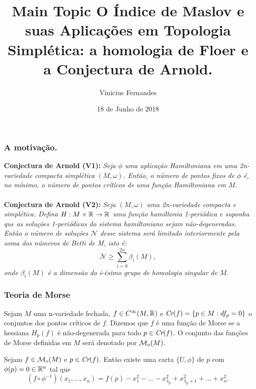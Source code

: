 \documentclass{beamer}
\title[Short title]{Main Topic } %
\author{Vinicius Fernandes}
\title{O Índice de Maslov e suas Aplicações em Topologia Simplética: a homologia de Floer e a Conjectura de Arnold.}
\institute{Universidade Federal do ABC}
\date{18 de Junho de 2018}
\begin{document}
	
	\begin{frame}
		\titlepage %
	\end{frame}
	
\begin{footnotesize}
	
	\begin{frame}
		\frametitle{
			A motivação.}
		\textbf{Conjectura de Arnold (V1):} \textit{Seja $\phi$ uma aplicação Hamiltoniana em uma 2n-variedade compacta simplética $(M, \omega)$. Então, o número de pontos fixos de $\phi$ é, no mínimo, o número de pontos críticos de uma função Hamiltoniana em $M$.}
		\\~\\
		
		\textbf{Conjectura de Arnold (V2):} \textit	{Seja $(M,\omega)$ uma 2n-variedade compacta e simplética. Defina  $H:M\times \mathbb{R}^{} \to \mathbb{R}^{}$  uma função hamiltonia 1-periódica e suponha que as soluções 1-periódicas do sistema hamiltoniano sejam não-degeneradas. Então o número de soluções $\mathcal{N}$ desse sistema será limitado interiormente pela soma dos números de Betti de M, isto é:
			$$
			\mathcal{N}\geq \sum_{i=0}^{2n}\beta_{i}(M),
			$$
			onde $\beta_{i}(M)$ é a dimensão do i-ésimo grupo de homologia singular de $M$.}
	\end{frame}
	\begin{frame}
		\frametitle{Teoria de Morse}
		\begin{definicao}
			Sejam $M$ uma n-variedade fechada, $f \in C^{\infty}(M, \mathbb{R}^{})$ e $\textit{Cr}(f) = \{p \in M: df_{p} = 0\}$ o conjuntos dos pontos críticos de $f$. Dizemos que $f$ é uma função de Morse se a hessiana $H_{p}(f)$ é não-degenerada para todo $p \in \textit{Cr}(f)$. O conjunto das funções de Morse definidas em $M$ será denotado por $\mathcal{M}_{o}(M)$. 
		\end{definicao}
		\begin{lema}
			Sejam $f \in \mathcal{M}_{o}(M)$ e $p \in \textit{Cr}(f)$. Então existe uma carta $\{U, \phi\}$ de $p$ com $\phi(p)=0 \in \mathbb{R}^{n}$ tal que 
			$$
			(f\circ \phi^{-1})(x_{1}, \dots, x_{n}) = f(p)-x_{1}^{2}-\dots -x^{2}_{\lambda_{p}}+x^{2}_{\lambda_{p}+1}+\dots + x^{2}_{n}.
			$$
		\end{lema}
	\end{frame}
	
	\begin{frame}
		

\end{frame}
\end{footnotesize}
\end{document}
